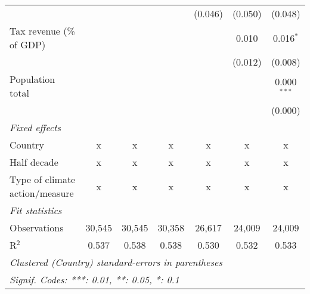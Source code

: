 \begin{tabular}{lcccccc}
                                                  &         &               &               & (0.046)       & (0.050)        & (0.048)\\   
   Tax revenue (\% of GDP)                        &         &               &               &               & 0.010          & 0.016$^{*}$\\   
                                                  &         &               &               &               & (0.012)        & (0.008)\\   
   Population total                               &         &               &               &               &                & 0.000$^{***}$\\   
                                                  &         &               &               &               &                & (0.000)\\   
   \emph{Fixed effects}\\
   Country                                        & x       & x             & x             & x             & x              & x\\  
   Half decade                                    & x       & x             & x             & x             & x              & x\\  
   Type of climate action/measure                 & x       & x             & x             & x             & x              & x\\  
   \midrule \emph{Fit statistics}\\
   Observations                                   & 30,545  & 30,545        & 30,358        & 26,617        & 24,009         & 24,009\\  
   R$^2$                                          & 0.537   & 0.538         & 0.538         & 0.530         & 0.532          & 0.533\\  
   \midrule
   \multicolumn{7}{l}{\emph{Clustered (Country) standard-errors in parentheses}}\\
   \multicolumn{7}{l}{\emph{Signif. Codes: ***: 0.01, **: 0.05, *: 0.1}}\\
\end{tabular}
\par\endgroup


